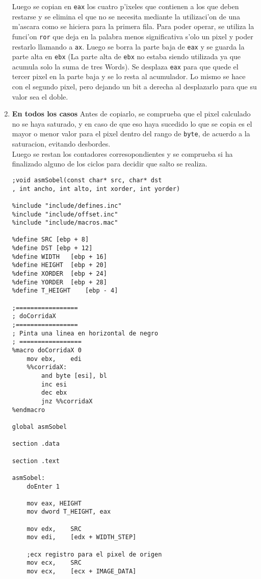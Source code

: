 \documentclass[11pt]{article}
\begin{document}
\begin{enumerate}
Luego se copian en \verb'eax' los cuatro p'ixeles que contienen a los que deben restarse y se elimina el que no se necesita mediante la utilizaci'on de una m'ascara como se hiciera para la primera fila. Para poder operar, se utiliza la funci'on \verb'ror' que deja en la palabra menos significativa s'olo un pixel y poder restarlo llamando a \verb'ax'. Luego se borra la parte baja de \verb'eax' y se guarda la parte alta en \verb'ebx' (La parte alta de \verb'ebx' no estaba siendo utilizada ya que acumula solo la suma de tres Words). Se desplaza \verb'eax' para que quede el tercer pixel en la parte baja y se lo resta al acumulador. Lo mismo se hace con el segundo pixel, pero dejando un bit a derecha al desplazarlo para que su valor sea el doble.
\item \textbf{En todos los casos}
\subitem Antes de copiarlo, se comprueba que el pixel calculado no se haya saturado, y en caso de que eso haya sucedido lo que se copia es el mayor o menor valor para el pixel dentro del rango de \verb'byte', de acuerdo a la saturacion, evitando desbordes.\\
Luego se restan los contadores corresopondientes y se comprueba si ha finalizado alguno de los ciclos para decidir que salto se realiza.
\begin{lstlisting}[frame=single]
;void asmSobel(const char* src, char* dst
, int ancho, int alto, int xorder, int yorder)

%include "include/defines.inc"
%include "include/offset.inc"
%include "include/macros.mac"

%define SRC	[ebp + 8]
%define DST	[ebp + 12]
%define WIDTH 	[ebp + 16]
%define HEIGHT	[ebp + 20]
%define XORDER	[ebp + 24]
%define YORDER	[ebp + 28]
%define T_HEIGHT	[ebp - 4]

;=================
; doCorridaX
;=================
; Pinta una linea en horizontal de negro
; =================
%macro doCorridaX 0
	mov ebx,	edi
	%%corridaX:
		and byte [esi], bl
		inc esi		
		dec ebx
		jnz %%corridaX
%endmacro

global asmSobel

section .data

section .text

asmSobel:
	doEnter 1

	mov eax, HEIGHT
	mov dword T_HEIGHT, eax

	mov	edx,	SRC
	mov	edi,	[edx + WIDTH_STEP]
	
	;ecx registro para el pixel de origen
	mov	ecx,	SRC	
	mov	ecx,	[ecx + IMAGE_DATA]


\end{lstlisting}
\end{enumerate}
\end{document}
